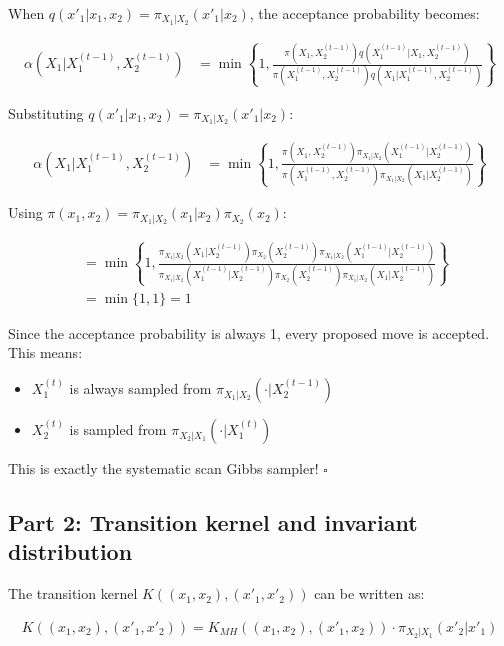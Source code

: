 \documentclass[11pt,a4paper]{article}
\begin{document}
When $q(x'_1|x_1, x_2) = \pi_{X_1|X_2}(x'_1|x_2)$, the acceptance probability becomes:

\begin{align}
\alpha(X_1|X_1^{(t-1)}, X_2^{(t-1)}) &= \min\left\{1, \frac{\pi(X_1, X_2^{(t-1)})q(X_1^{(t-1)}|X_1, X_2^{(t-1)})}{\pi(X_1^{(t-1)}, X_2^{(t-1)})q(X_1|X_1^{(t-1)}, X_2^{(t-1)})}\right\}
\end{align}

Substituting $q(x'_1|x_1, x_2) = \pi_{X_1|X_2}(x'_1|x_2)$:

\begin{align}
\alpha(X_1|X_1^{(t-1)}, X_2^{(t-1)}) &= \min\left\{1, \frac{\pi(X_1, X_2^{(t-1)})\pi_{X_1|X_2}(X_1^{(t-1)}|X_2^{(t-1)})}{\pi(X_1^{(t-1)}, X_2^{(t-1)})\pi_{X_1|X_2}(X_1|X_2^{(t-1)})}\right\}
\end{align}

Using $\pi(x_1, x_2) = \pi_{X_1|X_2}(x_1|x_2)\pi_{X_2}(x_2)$:

\begin{align}
&= \min\left\{1, \frac{\pi_{X_1|X_2}(X_1|X_2^{(t-1)})\pi_{X_2}(X_2^{(t-1)})\pi_{X_1|X_2}(X_1^{(t-1)}|X_2^{(t-1)})}{\pi_{X_1|X_2}(X_1^{(t-1)}|X_2^{(t-1)})\pi_{X_2}(X_2^{(t-1)})\pi_{X_1|X_2}(X_1|X_2^{(t-1)})}\right\}\\
&= \min\{1, 1\} = 1
\end{align}

Since the acceptance probability is always 1, every proposed move is accepted. This means:
\begin{itemize}
\item $X_1^{(t)}$ is always sampled from $\pi_{X_1|X_2}(\cdot|X_2^{(t-1)})$
\item $X_2^{(t)}$ is sampled from $\pi_{X_2|X_1}(\cdot|X_1^{(t)})$
\end{itemize}

This is exactly the systematic scan Gibbs sampler! $\square$

\subsection{Part 2: Transition kernel and invariant distribution}

The transition kernel $K((x_1, x_2), (x'_1, x'_2))$ can be written as:

\begin{align}
K((x_1, x_2), (x'_1, x'_2)) = K_{MH}((x_1, x_2), (x'_1, x_2)) \cdot \pi_{X_2|X_1}(x'_2|x'_1)
\end{align}
\end{document}
